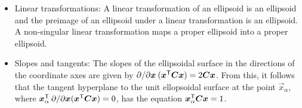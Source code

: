 \begin{itemize}
 \item Linear transformations: A linear transformation of an ellipsoid is an ellipsoid and the preimage of an ellipsoid under a linear transformation is an ellipsoid.  A non-singular linear transformation maps a proper ellipsoid into a proper ellipsoid. 

 \item Slopes and tangents: The slopes of the ellipsoidal surface in the directions of the coordinate
 axes are given by $\partial / \partial \bm{x} \: (\bm{x}^\mathsf{T} \bm{C} \bm{x}) = 2 \bm{C} \bm{x}$.
 From this, it follows that the tangent hyperplane to the unit ellopsoidal surface at the point
 $\vec{x}_\alpha$, where $\bm{x}_\alpha^\mathsf{T} \: \partial / \partial \bm{x} (\bm{x}^\mathsf{T} \bm{C} \bm{x}) = 0$,
 has the equation $\bm{x}_\alpha ^\mathsf{T} \bm{C} \bm{x} = 1$.
\end{itemize}

